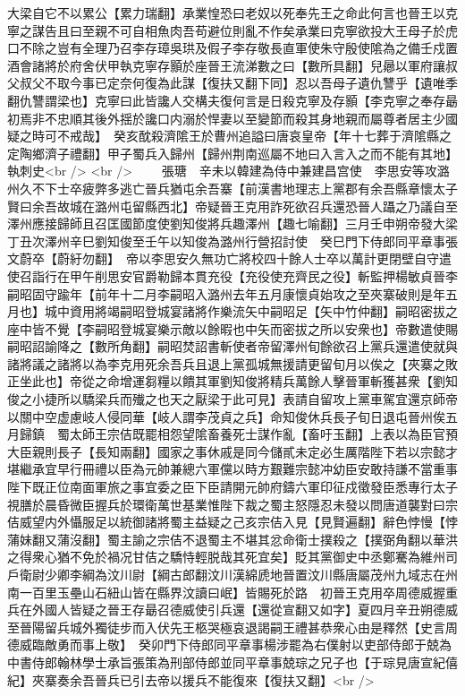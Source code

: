大梁自它不以累公【累力瑞翻】承業惶恐曰老奴以死奉先王之命此何言也晉王以克寧之謀告且曰至親不可自相魚肉吾苟避位則亂不作矣承業曰克寧欲投大王母子於虎口不除之豈有全理乃召李存璋吳珙及假子李存敬長直軍使朱守殷使隂為之備壬戍置酒會諸將於府舍伏甲執克寧存顥於座晉王流涕數之曰【數所具翻】兒曏以軍府讓叔父叔父不取今事已定奈何復為此謀【復扶又翻下同】忍以吾母子遺仇讐乎【遺唯季翻仇讐謂梁也】克寧曰此皆讒人交構夫復何言是日殺克寧及存顥【李克寧之奉存朂初焉非不忠順其後外揺於讒口内溺於悍妻以至變節而殺其身地親而屬尊者居主少國疑之時可不戒哉】　癸亥酖殺濟隂王於曹州追謚曰唐哀皇帝【年十七葬于濟隂縣之定陶鄉濟子禮翻】甲子蜀兵入歸州【歸州荆南巡屬不地曰入言入之而不能有其地】執刺史<br />
<br />
　　張瑭　辛未以韓建為侍中兼建昌宫使　李思安等攻潞州久不下士卒疲弊多逃亡晉兵猶屯余吾寨【前漢書地理志上黨郡有余吾縣章懷太子賢曰余吾故城在潞州屯留縣西北】帝疑晉王克用詐死欲召兵還恐晉人躡之乃議自至澤州應接歸師且召匡國節度使劉知俊將兵趣澤州【趣七喻翻】三月壬申朔帝發大梁丁丑次澤州辛巳劉知俊至壬午以知俊為潞州行營招討使　癸巳門下侍郎同平章事張文蔚卒【蔚紆勿翻】　帝以李思安久無功亡將校四十餘人士卒以萬計更閉壁自守遣使召詣行在甲午削思安官爵勒歸本貫充役【充役使充齊民之役】斬監押楊敏貞晉李嗣昭固守踰年【前年十二月李嗣昭入潞州去年五月康懷貞始攻之至夾寨破則是年五月也】城中資用將竭嗣昭登城宴諸將作樂流矢中嗣昭足【矢中竹仲翻】嗣昭密拔之座中皆不覺【李嗣昭登城宴樂示敵以餘暇也中矢而密拔之所以安衆也】帝數遣使賜嗣昭詔諭降之【數所角翻】嗣昭焚詔書斬使者帝留澤州旬餘欲召上黨兵還遣使就與諸將議之諸將以為李克用死余吾兵且退上黨孤城無援請更留旬月以俟之【夾寨之敗正坐此也】帝從之命增運芻糧以饋其軍劉知俊將精兵萬餘人擊晉軍斬獲甚衆【劉知俊之小捷所以驕梁兵而殱之也天之厭梁于此可見】表請自留攻上黨車駕宜還京師帝以關中空虚慮岐人侵同華【岐人謂李茂貞之兵】命知俊休兵長子旬日退屯晉州俟五月歸鎮　蜀太師王宗佶既罷相怨望隂畜養死士謀作亂【畜吁玉翻】上表以為臣官預大臣親則長子【長知兩翻】國家之事休戚是同今儲貳未定必生厲階陛下若以宗懿才堪繼承宜早行冊禮以臣為元帥兼總六軍儻以時方艱難宗懿冲幼臣安敢持謙不當重事陛下既正位南面軍旅之事宜委之臣下臣請開元帥府鑄六軍印征戍徵發臣悉專行太子視膳於晨昏微臣握兵於環衛萬世基業惟陛下裁之蜀主怒隱忍未發以問唐道襲對曰宗佶威望内外懾服足以統御諸將蜀主益疑之己亥宗佶入見【見賢遍翻】辭色悖慢【悖蒲妹翻又蒲沒翻】蜀主諭之宗佶不退蜀主不堪其忿命衛士撲殺之【撲弼角翻以華洪之得衆心猶不免於禍况甘佶之驕恃輕脱哉其死宜矣】貶其黨御史中丞鄭騫為維州司戶衛尉少卿李綱為汶川尉【綱古郎翻汶川漢綿虒地晉置汶川縣唐屬茂州九域志在州南一百里玉壘山石紐山皆在縣界汶讀曰岷】皆賜死於路　初晉王克用卒周德威握重兵在外國人皆疑之晉王存朂召德威使引兵還【還從宣翻又如字】夏四月辛丑朔德威至晉陽留兵城外獨徒步而入伏先王柩哭極哀退謁嗣王禮甚恭衆心由是釋然【史言周德威臨敵勇而事上敬】　癸卯門下侍郎同平章事楊涉罷為右僕射以吏部侍郎于兢為中書侍郎翰林學士承旨張策為刑部侍郎並同平章事兢琮之兄子也【于琮見唐宣紀僖紀】夾寨奏余吾晉兵已引去帝以援兵不能復來【復扶又翻】<br />
